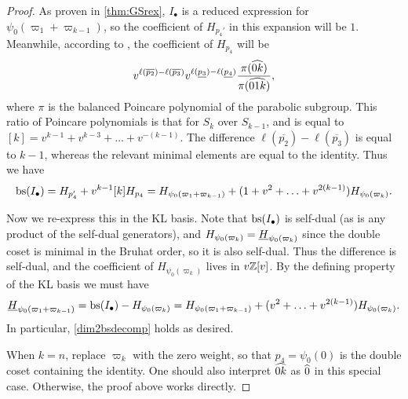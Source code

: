 \begin{proof}
As proven in \cref{thm:GSrex}, $I_{\bullet}$ is a reduced expression for $\psi_0(\varpi_1 + \varpi_{k-1})$, so the coefficient of $H_{p_4'}$ in this expansion will be $1$. Meanwhile, according to \cite[Proposition 2.3.3(1)]{WillSingular}, the coefficient of $H_{p_4}$ will be
\begin{equation} v^{\ell(\overline{p_2}) - \ell(\overline{p_3})} v^{\ell(\underline{p_3}) - \ell(\underline{p_4})} \frac{\pi(\widehat{0k})}{\pi(\widehat{01k})}, \end{equation}
where $\pi$ is the balanced Poincare polynomial of the parabolic subgroup. This ratio of Poincare polynomials is that for $S_k$ over $S_{k-1}$, and is equal to $[k] = v^{k-1} + v^{k-3} + \ldots + v^{-(k-1)}$. The difference $\ell(\overline{p_2}) - \ell(\overline{p_3})$ is equal to $k-1$, whereas the relevant minimal elements are equal to the identity. Thus we have
\begin{equation} \operatorname{bs}(I_{\bullet}) = H_{p_4'} + v^{k-1} [k] H_{p_4} = H_{\psi_0(\varpi_1 + \varpi_{k-1})} + (1 + v^2 + \ldots + v^{2(k-1)}) H_{\psi_0(\varpi_k)}. \end{equation}

Now we re-express this in the KL basis. Note that $\operatorname{bs}(I_{\bullet})$ is self-dual (as is any product of the self-dual generators), and $H_{\psi_0(\varpi_k)} = \underline{H}_{\psi_0(\varpi_k)}$ since the double coset is minimal in the Bruhat order, so it is also self-dual. Thus the difference is self-dual, and the coefficient of $H_{\psi_0(\varpi_k)}$ lives in $v \mathbb{Z}[v]$. By the defining property of the KL basis we must have
\begin{equation} \underline{H}_{\psi_0(\varpi_1 + \varpi_{k-1})} = \operatorname{bs}(I_{\bullet}) - H_{\psi_0(\varpi_k)} = H_{\psi_0(\varpi_1 + \varpi_{k-1})} + (v^2 + \ldots + v^{2(k-1)}) H_{\psi_0(\varpi_k)}. \end{equation}
In particular, \eqref{dim2bsdecomp} holds as desired.

When $k=n$, replace $\varpi_k$ with the zero weight, so that $p_4 = \psi_0(0)$ is the double coset containing the identity. One should also interpret $\widehat{0k}$ as $\widehat{0}$ in this special case. Otherwise, the proof above works directly.
\end{proof}

